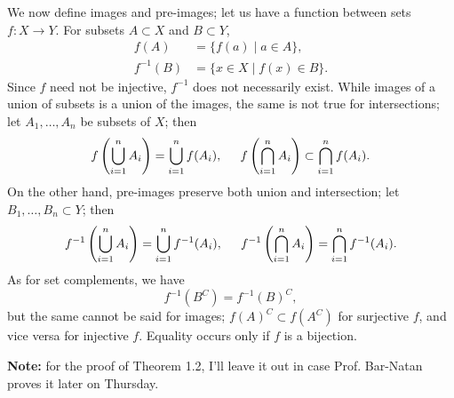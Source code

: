 \noindent We now define images and pre-images; let us have a function between sets $f : X \to Y$. For subsets $A \subset X$ and $B \subset Y$,
\begin{align*}
    f(A) &= \{f(a) \mid a \in A\}, \\
    f^{-1}(B) &= \{x \in X \mid f(x) \in B\}.
\end{align*}
Since $f$ need not be injective, $f^{-1}$ does not necessarily exist. While images of a union of subsets is a union of the images, the same is not true for intersections; let $A_1, \dots, A_n$ be subsets of $X$; then
\[ f\left( \bigcup_{i=1}^n A_i \right) = \bigcup_{i=1}^n f(A_i), \hspace{0.2in} f\left( \bigcap_{i=1}^n A_i \right) \subset \bigcap_{i=1}^n f(A_i). \]
On the other hand, pre-images preserve both union and intersection; let $B_1, \dots, B_n \subset Y$; then
\[ f^{-1}\left( \bigcup_{i=1}^n A_i \right) = \bigcup_{i=1}^n f^{-1}(A_i), \hspace{0.2in} f^{-1}\left( \bigcap_{i=1}^n A_i \right) = \bigcap_{i=1}^n f^{-1}(A_i). \]
As for set complements, we have
\[ f^{-1}(B^C) = f^{-1}(B)^C, \]
but the same cannot be said for images; $f(A)^C \subset f(A^C)$ for surjective $f$, and vice versa for injective $f$. Equality occurs only if $f$ is a bijection.

\medskip
\noindent \textbf{Note:} for the proof of Theorem 1.2, I'll leave it out in case Prof. Bar-Natan proves it later on Thursday.